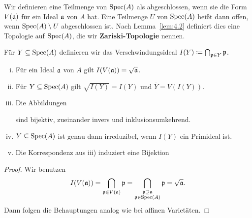 \begin{defn}
	Wir definieren eine Teilmenge von $\operatorname{Spec}(A)$ als abgeschlossen, wenn sie die Form $V(\mathfrak{a})$ für ein Ideal $\mathfrak{a}$ von $A$ hat. Eine Teilmenge $U$ von $\operatorname{Spec}(A)$ heißt dann offen, wenn $\operatorname{Spec}(A)\setminus U$ abgeschlossen ist. Nach Lemma~\ref{lem:4.2} definiert dies eine Topologie auf $\operatorname{Spec}(A)$, die wir \textbf{Zariski-Topologie} nennen.
\end{defn}

\begin{prop}
\label{prop:4.4}
	Für $Y\subseteq \operatorname{Spec}(A)$ definieren wir das Verschwindungsideal $I(Y) \coloneqq \bigcap_{\mathfrak{p} \in Y} \mathfrak{p}$.
	\begin{enumerate}[i)]
		\item Für ein Ideal $\mathfrak{a}$ von $A$ gilt $I(V(\mathfrak{a})) = \sqrt{\mathfrak{a}}$.
		\item Für $Y \subseteq \operatorname{Spec}(A)$ gilt $\sqrt{I(Y)}=I(Y)$ und $\overline{Y} = V(I(Y))$.
		\item Die Abbildungen
		\begin{center}
		\end{center}
		sind bijektiv, zueinander invers und inklusionsumkehrend.
		\item $Y \subseteq \operatorname{Spec}(A)$ ist genau dann irreduzibel, wenn $I(Y)$ ein Primideal ist.
		\item Die Korrespondenz aus iii) induziert eine Bijektion
		\begin{center}
		\end{center}
	\end{enumerate}
	\begin{proof}
		Wir benutzen
		\[
			I(V(\mathfrak{a})) = \bigcap_{\mathfrak{p} \in V(\mathfrak{a})}\mathfrak{p} = \bigcap_{\substack{\mathfrak{p} \supseteq \mathfrak{a}\\\mathfrak{p} \in \operatorname{Spec}(A)}}\mathfrak{p} = \sqrt{\mathfrak{a}}.
		\]
		Dann folgen die Behauptungen analog wie bei affinen Varietäten.
	\end{proof}
\end{prop}

